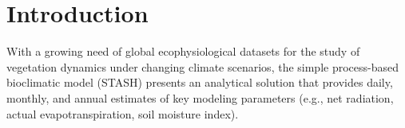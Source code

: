 %
%
%
%
%
\section{Introduction}
\label{sec:intro}
With a growing need of global ecophysiological datasets for the study of vegetation dynamics under changing climate scenarios, the simple process-based bioclimatic model (STASH) presents an analytical solution that provides daily, monthly, and annual estimates of key modeling parameters (e.g., net radiation, actual evapotranspiration, soil moisture index).


